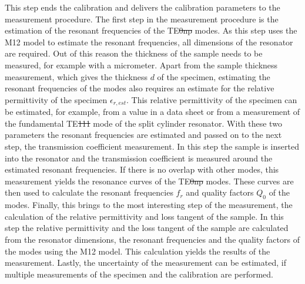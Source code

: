 This step ends the calibration and delivers the calibration parameters to the measurement procedure. The first step in the measurement procedure is the estimation of the resonant frequencies of the TE\st{0np} modes. As this step uses the M12 model to estimate the resonant frequencies, all dimensions of the resonator are required. Out of this reason the thickness of the sample needs to be measured, for example with a micrometer. Apart from the sample thickness measurement, which gives the thickness $d$ of the specimen, estimating the resonant frequencies of the modes also requires an estimate for the relative permittivity of the specimen $\epsilon_{r,est}$. This relative permittivity of the specimen can be estimated, for example, from a value in a data sheet or from a measurement of the fundamental TE\st{111} mode of the split cylinder resonator. With these two parameters the resonant frequencies are estimated and passed on to the next step, the transmission coefficient measurement. In this step the sample is inserted into the resonator and the transmission coefficient is measured around the estimated resonant frequencies. If there is no overlap with other modes, this measurement yields the resonance curves of the TE\st{0np} modes. These curves are then used to calculate the resonant frequencies $f_r$ and quality factors $Q_0$ of the modes. Finally, this brings to the most interesting step of the measurement, the calculation of the relative permittivity and loss tangent of the sample. In this step the relative permittivity and the loss tangent of the sample are calculated from the resonator dimensions, the resonant frequencies and the quality factors of the modes using the M12 model. This calculation yields the results of the measurement. Lastly, the uncertainty of the measurement can be estimated, if multiple measurements of the specimen and the calibration are performed. 
